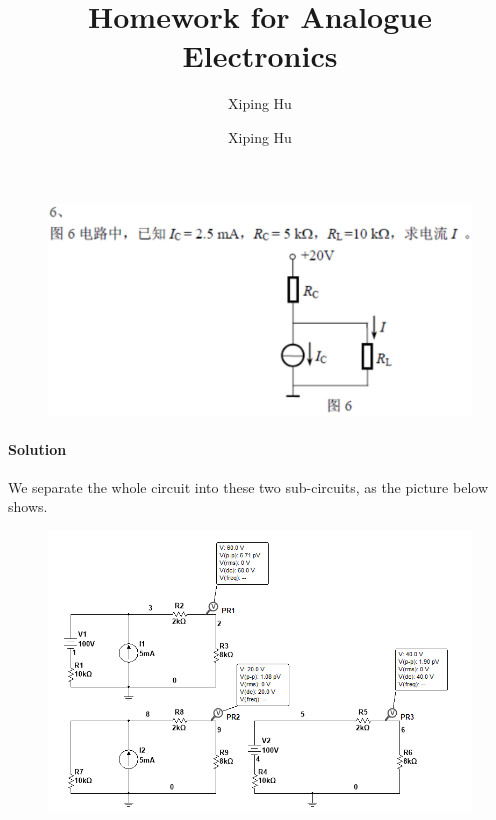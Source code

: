 \documentclass{article}
\author{Xiping Hu}
\author{Xiping Hu}
\affil{http://thehxp.tech/}
\title{Homework for Analogue Electronics}
\begin{document}
\maketitle

\begin{figure}[H]
  \centering
  \includegraphics[width=\linewidth]{figures/6}
  \label{fig:}
\end{figure}

\paragraph{Solution}

We separate the whole circuit into these two sub-circuits, as the picture below shows.

\begin{figure}[H]
  \centering
  \includegraphics[width=\linewidth]{figures/9}
  \label{fig:}
\end{figure}
\end{document}
